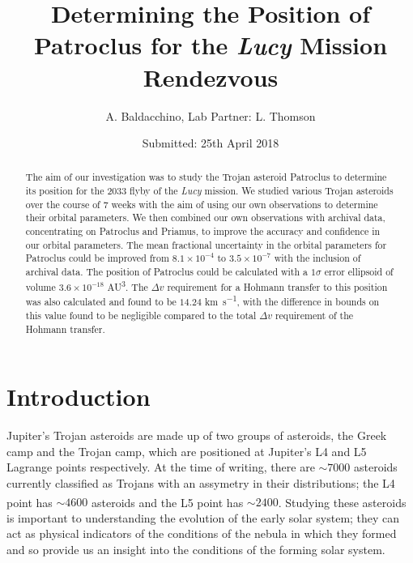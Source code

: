 \documentclass[10pt, twocolumn]{revtex4}    %
\begin{document}
                     

\title{Determining the Position of Patroclus for the \textit{Lucy} Mission Rendezvous} 
\date{Submitted: 25th April 2018}
\author{A. Baldacchino, Lab Partner: L. Thomson}

\begin{abstract}              

The aim of our investigation was to study the Trojan asteroid Patroclus to determine its position for the 2033 flyby of the \textit{Lucy} mission. We studied various Trojan asteroids over the course of 7 weeks with the aim of using our own observations to determine their orbital parameters. We then combined our own observations with archival data, concentrating on Patroclus and Priamus, to improve the accuracy and confidence in our orbital parameters. The mean fractional uncertainty in the orbital parameters for Patroclus could be improved from $8.1 \times 10^{-4}$ to $3.5 \times 10^{-7}$ with the inclusion of archival data. The position of Patroclus could be calculated with a $1\sigma$ error ellipsoid of volume $3.6 \times 10^{-18}$ \si{AU^{3}}. The $\Delta v$ requirement for a Hohmann transfer to this position was also calculated and found to be $14.24$ \si{\kilo\metre\per\second}, with the difference in bounds on this value found to be negligible compared to the total $\Delta v$ requirement of the Hohmann transfer. 

\end{abstract}

\maketitle
\thispagestyle{plain} %

\section{Introduction} 

Jupiter's Trojan asteroids are made up of two groups of asteroids, the Greek camp and the Trojan camp, which are positioned at Jupiter's L4 and L5 Lagrange points respectively. At the time of writing, there are ${\sim}7000$ asteroids currently classified as Trojans with an assymetry in their distributions; the L4 point has ${\sim}4600$ asteroids and the L5 point has ${\sim}2400$.\textsuperscript{\cite{ListJupiterTrojans}} Studying these asteroids is important to understanding the evolution of the early solar system; they can act as physical indicators of the conditions of the nebula in which they formed and so provide us an insight into the conditions of the forming solar system.
\end{document}
